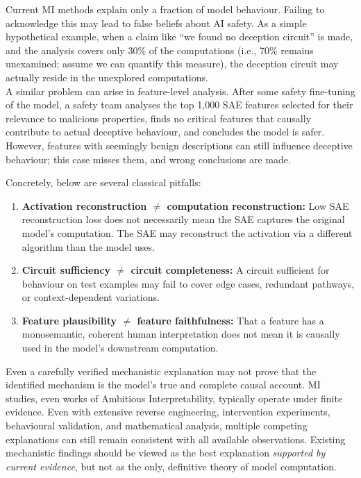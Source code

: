 \begin{warningbox}
Current MI methods explain only a fraction of model behaviour. Failing to acknowledge this may lead to false beliefs about AI safety. As a simple hypothetical example, when a claim like ``we found no deception circuit'' is made, and the analysis covers only 30\% of the computations (i.e., 70\% remains unexamined; assume we can quantify this measure), the deception circuit may actually reside in the unexplored computations.\\

A similar problem can arise in feature-level analysis. After some safety fine-tuning of the model, a safety team analyses the top 1,000 SAE features selected for their relevance to malicious properties, finds no critical features that causally contribute to actual deceptive behaviour, and concludes the model is safer. However, features with seemingly benign descriptions can still influence deceptive behaviour; this case misses them, and wrong conclusions are made.

\end{warningbox}

Concretely, below are several classical pitfalls:

\begin{enumerate}
    \item \textbf{Activation reconstruction $\neq$ computation reconstruction:} Low SAE reconstruction loss does not necessarily mean the SAE captures the original model's computation. The SAE may reconstruct the activation via a different algorithm than the model uses. 
    \item \textbf{Circuit sufficiency $\neq$ circuit completeness:} A circuit sufficient for behaviour on test examples may fail to cover edge cases, redundant pathways, or context-dependent variations.
    \item \textbf{Feature plausibility $\neq$ feature faithfulness:} That a feature has a monosemantic, coherent human interpretation does not mean it is causally used in the model’s downstream computation.
\end{enumerate}

Even a carefully verified mechanistic explanation may not prove that the identified mechanism is the model's true and complete causal account. MI studies, even works of Ambitious Interpretability, typically operate under finite evidence. Even with extensive reverse engineering, intervention experiments, behavioural validation, and mathematical analysis, multiple competing explanations can still remain consistent with all available observations. Existing mechanistic findings should be viewed as the best explanation \emph{supported by current evidence}, but not as the only, definitive theory of model computation.

